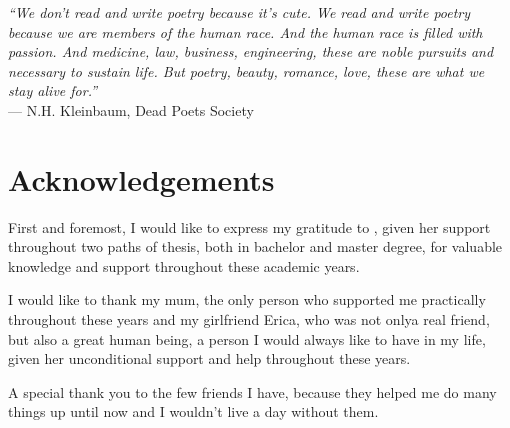 \cleardoublepage
{}
{}

\begin{flushright}{
    \slshape
    ``We don't read and write poetry because it's cute. We read and write poetry because we are members of the human race. And the human race is filled with passion. And medicine, law, business, engineering, these are noble pursuits and necessary to sustain life. But poetry, beauty, romance, love, these are what we stay alive for.''} \\
    \medskip
    --- N.H. Kleinbaum, Dead Poets Society
\end{flushright}

\begingroup
\let\clearpage\relax
\let\cleardoublepage\relax
\let\cleardoublepage\relax

\chapter*{Acknowledgements}

\noindent First and foremost, I would like to express my gratitude to \myProf, given her support throughout two paths of thesis, both in bachelor and master degree, for valuable knowledge and support throughout these academic years.

\vspace{0.35cm}

\noindent I would like to thank my mum, the only person who supported me practically throughout these years and my girlfriend Erica, who was not onlya real friend, but also a great human being, a person I would always like to have in my life, given her unconditional support and help throughout these years.

\vspace{0.35cm}

\noindent A special thank you to the few friends I have, because they helped me do many things up until now and I wouldn't live a day without them.

\vspace{0.75cm}

\noindent{\myLocation, \myTime}
\hfill \textit{\myName}

\endgroup
